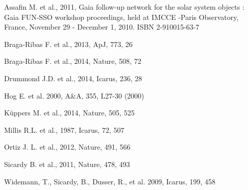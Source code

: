 \documentclass[useAMS,usenatbib]{mn2e}
\begin{document}
\begin{thebibliography}{99}

 Assafin M. et al., 2011, Gaia follow-up network for the solar system objects : Gaia FUN-SSO workshop proceedings, held at IMCCE -Paris Observatory, France, November 29 - December 1, 2010. ISBN 2-910015-63-7


 Braga-Ribas F. et al., 2013,
ApJ, 773, 26

 Braga-Ribas F. et al., 2014,
Nature, 508, 72

 Drummond J.D. et al., 2014,
Icarus, 236, 28

 Hog E. et al. 2000, A\&A, 355, L27-30 (2000)

 K\"{u}ppers M. et al., 2014,
Nature, 505, 525

 Millis R.L. et al., 1987,
Icarus, 72, 507

 Ortiz J. L. et al., 2012,
Nature, 491, 566

 Sicardy B. et al., 2011,
Nature, 478, 493

 Widemann, T., Sicardy, B., Dusser, R., et al. 2009, Icarus, 199, 458


\end{thebibliography}
\end{document}
